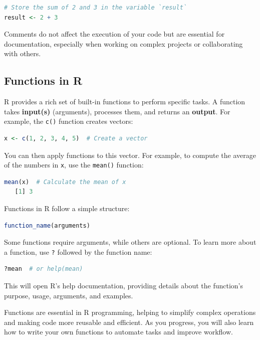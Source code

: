 \documentclass[
]{book}
\newcommand{\passthrough}[1]{#1}
\theoremstyle{definition}
\theoremstyle{definition}
\theoremstyle{definition}
\theoremstyle{definition}
\theoremstyle{remark}
\begin{document}
\begin{lstlisting}[language=R]
# Store the sum of 2 and 3 in the variable `result`
result <- 2 + 3
\end{lstlisting}

Comments do not affect the execution of your code but are essential for documentation, especially when working on complex projects or collaborating with others.

\subsection{Functions in R}\label{functions-in-r}

R provides a rich set of built-in functions to perform specific tasks. A function takes \textbf{input(s)} (arguments), processes them, and returns an \textbf{output}. For example, the \passthrough{\lstinline!c()!} function creates vectors:

\begin{lstlisting}[language=R]
x <- c(1, 2, 3, 4, 5)  # Create a vector
\end{lstlisting}

You can then apply functions to this vector. For example, to compute the average of the numbers in \passthrough{\lstinline!x!}, use the \passthrough{\lstinline!mean()!} function:

\begin{lstlisting}[language=R]
mean(x)  # Calculate the mean of x
   [1] 3
\end{lstlisting}

Functions in R follow a simple structure:

\begin{lstlisting}[language=R]
function_name(arguments)
\end{lstlisting}

Some functions require arguments, while others are optional. To learn more about a function, use \passthrough{\lstinline!?!} followed by the function name:

\begin{lstlisting}[language=R]
?mean  # or help(mean)
\end{lstlisting}

This will open R's help documentation, providing details about the function's purpose, usage, arguments, and examples.

Functions are essential in R programming, helping to simplify complex operations and making code more reusable and efficient. As you progress, you will also learn how to write your own functions to automate tasks and improve workflow.
\end{document}
